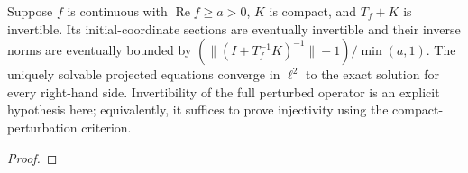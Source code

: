 \begin{theorem}
\label{thm:toeplitz-stable-sections}
\leanok
Suppose $f$ is continuous with $\operatorname{Re}f\ge a>0$, $K$ is compact,
and $T_f+K$ is invertible. Its initial-coordinate sections are eventually
invertible and their inverse norms are eventually bounded by
$(\|(I+T_f^{-1}K)^{-1}\|+1)/\min(a,1)$.
The uniquely solvable projected equations converge in $\ell^2$ to the exact
solution for every right-hand side. Invertibility of the full perturbed
operator is an explicit hypothesis here; equivalently, it suffices to prove
injectivity using the compact-perturbation criterion.
\end{theorem}
\begin{proof}
\leanok
\end{proof}


